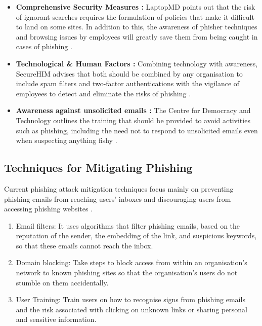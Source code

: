 \begin{itemize}
    
     \item \textbf{Comprehensive Security Measures :} LaptopMD points out that the risk of ignorant searches requires the formulation of policies that make it difficult to land on some sites. In addition to this, the awareness of phisher techniques and browsing issues by employees will greatly save them from being caught in cases of phishing \cite{DigitalGuardianPhishingPrevention}.
     
     \item \textbf{Technological \& Human Factors :} Combining technology with awareness, SecureHIM advises that both should be combined by any organisation to include spam filters and two-factor authentications with the vigilance of employees to detect and eliminate the risks of phishing \cite{DigitalGuardianPhishingPrevention}.
     
     \item \textbf{Awareness against unsolicited emails :} The Centre for Democracy and Technology outlines the training that should be provided to avoid activities such as phishing, including the need not to respond to unsolicited emails even when suspecting anything fishy \cite{CDTPhishingMitigation}.
     
     
\end{itemize}

\subsection{Techniques for Mitigating Phishing}

Current phishing attack mitigation techniques focus mainly on preventing phishing
emails from reaching users' inboxes and discouraging users from accessing
phishing websites \cite{Suzuki2021Phishing}.

\begin{enumerate}
    \item Email filters: It uses algorithms that filter phishing emails, based on the reputation of the sender, the embedding of the link, and suspicious keywords, so that these emails cannot reach the inbox.
    \item Domain blocking: Take steps to block access from within an organisation's network to known phishing sites so that the organisation's users do not stumble on them accidentally.
    \item User Training: Train users on how to recognise signs from phishing emails and the risk associated with clicking on unknown links or sharing personal and sensitive information.
\end{enumerate}

